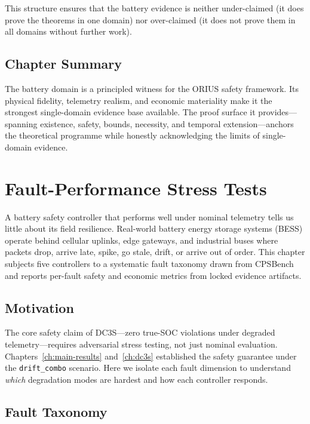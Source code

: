 This structure ensures that the battery evidence is neither under-claimed
(it does prove the theorems in one domain) nor over-claimed (it does not
prove them in all domains without further work).

\subsection{Chapter Summary}

The battery domain is a principled witness for the ORIUS safety framework.
Its physical fidelity, telemetry realism, and economic materiality make it
the strongest single-domain evidence base available.  The proof surface it
provides---spanning existence, safety, bounds, necessity, and temporal
extension---anchors the theoretical programme while honestly
acknowledging the limits of single-domain evidence.



\section{Fault-Performance Stress Tests}
\label{ch:fault-stress}

A battery safety controller that performs well under nominal telemetry
tells us little about its field resilience.  Real-world battery energy
storage systems (BESS) operate behind cellular uplinks, edge gateways,
and industrial buses where packets drop, arrive late, spike, go stale,
drift, or arrive out of order.  This chapter subjects five controllers
to a systematic fault taxonomy drawn from CPSBench and reports per-fault
safety and economic metrics from locked evidence artifacts.

\subsection{Motivation}

The core safety claim of DC3S---zero true-SOC violations under degraded
telemetry---requires adversarial stress testing, not just nominal
evaluation.  Chapters~\ref{ch:main-results} and~\ref{ch:dc3s} established
the safety guarantee under the \texttt{drift\_combo} scenario.  Here we
isolate each fault dimension to understand \emph{which} degradation modes
are hardest and how each controller responds.

\subsection{Fault Taxonomy}

